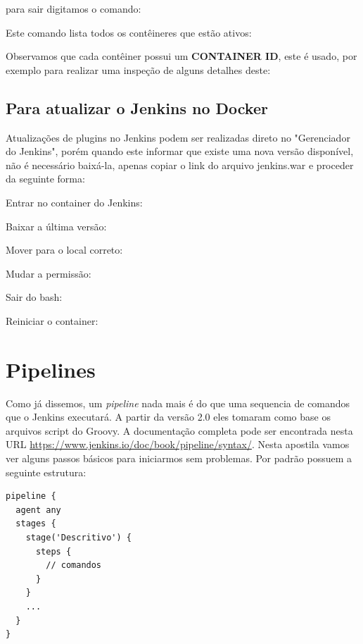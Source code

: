 \documentclass[a4paper,11pt]{article}
\begin{document}
para sair digitamos o comando:

Este comando lista todos os contêineres que estão ativos:

Observamos que cada contêiner possui um \textbf{CONTAINER ID}, este é usado, por exemplo para realizar uma inspeção de alguns detalhes deste:

\subsection{Para atualizar o Jenkins no Docker}
Atualizações de plugins no Jenkins podem ser realizadas direto no "Gerenciador do Jenkins", porém quando este informar que existe uma nova versão disponível, não é necessário baixá-la, apenas copiar o link do arquivo jenkins.war e proceder da seguinte forma:

Entrar no container do Jenkins: \\

Baixar a última versão: \\

Mover para o local correto: \\

Mudar a permissão: \\

Sair do bash: \\

Reiniciar o container: \\

\section{Pipelines}
Como já dissemos, um \textit{pipeline} nada mais é do que uma sequencia de comandos que o Jenkins executará. A partir da versão 2.0 eles tomaram como base os arquivos script do Groovy.
A documentação completa pode ser encontrada nesta URL \url{https://www.jenkins.io/doc/book/pipeline/syntax/}. Nesta apostila vamos ver alguns passos básicos para iniciarmos sem problemas. Por padrão possuem a seguinte estrutura:
\begin{lstlisting}
pipeline {
  agent any
  stages {
    stage('Descritivo') {
      steps {
        // comandos
      }
    }
    ...
  }
}
\end{lstlisting}
\end{document}
